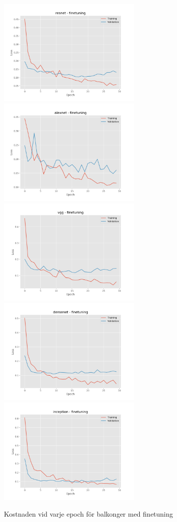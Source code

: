 \documentclass[]{kththesis}
\begin{document}
\begin{figure}[h]
  \includegraphics[width=7cm]{b_l_resnet_fine}
  \includegraphics[width=7cm]{b_l_alexnet_fine}
  \includegraphics[width=7cm]{b_l_vgg_fine}
  \includegraphics[width=7cm]{b_l_densenet_fine}
  \includegraphics[width=7cm]{b_l_inception_fine}
  \caption{Kostnaden vid varje epoch för balkonger med finetuning}
  \label{fig:b_l_2}
\end{figure}
\end{document}
